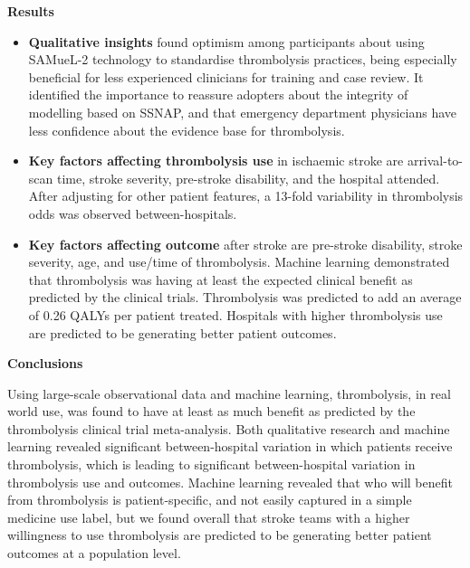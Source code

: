 \textbf{Results}

\begin{itemize}

    \item \textbf{Qualitative insights} found optimism among participants about using SAMueL-2 technology to standardise thrombolysis practices, being especially beneficial for less experienced clinicians for training and case review. It identified the importance to reassure adopters about the integrity of modelling based on SSNAP, and that emergency department physicians have less confidence about the evidence base for thrombolysis.
    
    \item \textbf{Key factors affecting thrombolysis use} in ischaemic stroke are arrival-to-scan time, stroke severity, pre-stroke disability, and the hospital attended. After adjusting for other patient features, a 13-fold variability in thrombolysis odds was observed between-hospitals.
    
    \item \textbf{Key factors affecting outcome} after stroke are pre-stroke disability, stroke severity, age, and use/time of thrombolysis. Machine learning demonstrated that thrombolysis was having at least the expected clinical benefit as predicted by the clinical trials. Thrombolysis was predicted to add an average of 0.26 QALYs per patient treated. Hospitals with higher thrombolysis use are predicted to be generating better patient outcomes.
    

    \end{itemize}

\textbf{Conclusions}

Using large-scale observational data and machine learning, thrombolysis, in real world use, was found to have at least as much benefit as predicted by the thrombolysis clinical trial meta-analysis. Both qualitative research and machine learning revealed significant between-hospital variation in which patients receive thrombolysis, which is leading to significant between-hospital variation in thrombolysis use and outcomes. Machine learning revealed that who will benefit from thrombolysis is patient-specific, and not easily captured in a simple medicine use label, but we found overall that stroke teams with a higher willingness to use thrombolysis are predicted to be generating better patient outcomes at a population level.

